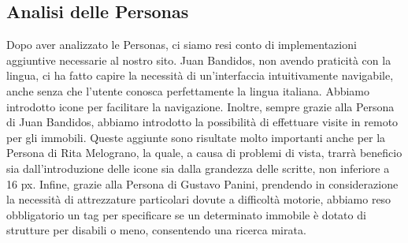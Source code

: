     \subsection{Analisi delle Personas}
    Dopo aver analizzato le Personas, ci siamo resi conto di implementazioni aggiuntive necessarie al nostro sito. \newline
    Juan Bandidos, non avendo praticità con la lingua, ci ha fatto capire la necessità di un'interfaccia intuitivamente navigabile, anche senza che l'utente conosca perfettamente la lingua italiana. Abbiamo introdotto icone per facilitare la navigazione.\newline
    Inoltre, sempre grazie alla Persona di Juan Bandidos, abbiamo introdotto la possibilità di effettuare visite in remoto per gli immobili.\newline
    Queste aggiunte sono risultate molto importanti anche per la Persona di Rita Melograno, la quale, a causa di problemi di vista, trarrà beneficio sia dall'introduzione delle icone sia dalla grandezza delle scritte, non inferiore a 16 px.\newline
    Infine, grazie alla Persona di Gustavo Panini, prendendo in considerazione la necessità di attrezzature particolari dovute a difficoltà motorie, abbiamo reso obbligatorio un tag per specificare se un determinato immobile è dotato di strutture per disabili o meno, consentendo una ricerca mirata.\newline
\hfill



